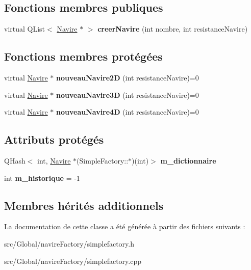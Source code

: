 \subsection*{Fonctions membres publiques}
\begin{DoxyCompactItemize}
\item 
virtual Q\+List$<$ \hyperlink{class_navire}{Navire} $\ast$ $>$ {\bfseries creer\+Navire} (int nombre, int resistance\+Navire)\hypertarget{class_simple_factory_af2c8730a810a997d360e3aa3d8247d03}{}\label{class_simple_factory_af2c8730a810a997d360e3aa3d8247d03}

\end{DoxyCompactItemize}
\subsection*{Fonctions membres protégées}
\begin{DoxyCompactItemize}
\item 
virtual \hyperlink{class_navire}{Navire} $\ast$ {\bfseries nouveau\+Navire2D} (int resistance\+Navire)=0\hypertarget{class_simple_factory_a80289ea3cc80da52216a4fc2dcd5057b}{}\label{class_simple_factory_a80289ea3cc80da52216a4fc2dcd5057b}

\item 
virtual \hyperlink{class_navire}{Navire} $\ast$ {\bfseries nouveau\+Navire3D} (int resistance\+Navire)=0\hypertarget{class_simple_factory_ad3451c4bf206ebd42c5ac1592fd89607}{}\label{class_simple_factory_ad3451c4bf206ebd42c5ac1592fd89607}

\item 
virtual \hyperlink{class_navire}{Navire} $\ast$ {\bfseries nouveau\+Navire4D} (int resistance\+Navire)=0\hypertarget{class_simple_factory_a86072a6a7828bf45fbb98af88d82a551}{}\label{class_simple_factory_a86072a6a7828bf45fbb98af88d82a551}

\end{DoxyCompactItemize}
\subsection*{Attributs protégés}
\begin{DoxyCompactItemize}
\item 
Q\+Hash$<$ int, \hyperlink{class_navire}{Navire} $\ast$(Simple\+Factory\+::$\ast$)(int)$>$ {\bfseries m\+\_\+dictionnaire}\hypertarget{class_simple_factory_a3bb8cf70370b7b11d8c4c454c2b45645}{}\label{class_simple_factory_a3bb8cf70370b7b11d8c4c454c2b45645}

\item 
int {\bfseries m\+\_\+historique} = -\/1\hypertarget{class_simple_factory_a52e7d40045d933245ac5b88635a818de}{}\label{class_simple_factory_a52e7d40045d933245ac5b88635a818de}

\end{DoxyCompactItemize}
\subsection*{Membres hérités additionnels}


La documentation de cette classe a été générée à partir des fichiers suivants \+:\begin{DoxyCompactItemize}
\item 
src/\+Global/navire\+Factory/simplefactory.\+h\item 
src/\+Global/navire\+Factory/simplefactory.\+cpp\end{DoxyCompactItemize}
